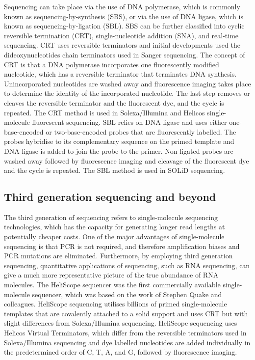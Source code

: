 Sequencing can take place via the use of DNA polymerase, which is commonly known as sequencing-by-synthesis (SBS), or via the use of DNA ligase, which is known as sequencing-by-ligation (SBL). SBS can be further classified into cyclic reversible termination (CRT), single-nucleotide addition (SNA), and real-time sequencing\cite{pmid19997069}. CRT uses reversible terminators and initial developments used the dideoxynucleotides chain terminators used in Sanger sequencing. The concept of CRT is that a DNA polymerase incorporates one fluorescently modified nucleotide, which has a reversible terminator that terminates DNA synthesis. Unincorporated nucleotides are washed away and fluorescence imaging takes place to determine the identity of the incorporated nucleotide. The last step removes or cleaves the reversible terminator and the fluorescent dye, and the cycle is repeated. The CRT method is used in Solexa/Illumina and Helicos single-molecule fluorescent sequencing. SBL relies on DNA ligase and uses either one-base-encoded or two-base-encoded probes that are fluorescently labelled. The probes hybridise to its complementary sequence on the primed template and DNA ligase is added to join the probe to the primer. Non-ligated probes are washed away followed by fluorescence imaging and cleavage of the fluorescent dye and the cycle is repeated. The SBL method is used in SOLiD sequencing.

\subsection{Third generation sequencing and beyond}

The third generation of sequencing refers to single-molecule sequencing technologies, which has the capacity for generating longer read lengths at potentially cheaper costs\cite{pmid20858600}. One of the major advantages of single-molecule sequencing is that PCR is not required, and therefore amplification biases and PCR mutations are eliminated. Furthermore, by employing third generation sequencing, quantitative applications of sequencing, such as RNA sequencing, can give a much more representative picture of the true abundance of RNA molecules. The HeliScope sequencer was the first commercially available single-molecule sequencer, which was based on the work of Stephen Quake and colleagues\cite{pmid12651960}. HeliScope sequencing utilises billions of primed single-molecule templates that are covalently attached to a solid support and uses CRT but with slight differences from Solexa/Illumina sequencing. HeliScope sequencing uses Helicos Virtual Terminators, which differ from the reversible terminators used in Solexa/Illumina sequencing and dye labelled nucleotides are added individually in the predetermined order of C, T, A, and G, followed by fluorescence imaging.

